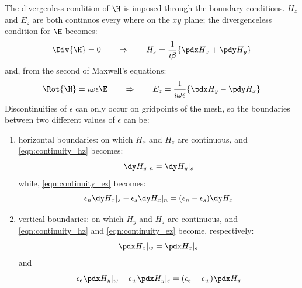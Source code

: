 The divergenless condition of $\H$ is imposed through the boundary
conditions. $H_z$ and $E_z$ are both continuos every where on the $xy$
plane; the divergenceless condition for $\H$ becomes:
\begin{equation} \label{eqn:continuity_hz}
\Div{\H} = 0 \qquad \Rightarrow \qquad H_z = \frac{1}{\imath
  \beta} \{ \pdx H_x + \pdy H_y \}
\end{equation}
and, from the second of Maxwell's equations:
\begin{equation} \label{eqn:continuity_ez}
  \Rot{\H} = \imath \omega \epsilon \E \qquad \Rightarrow \qquad E_z =
  \frac{1}{\imath \omega \epsilon} \{ \pdx H_y - \pdy H_x \}
\end{equation}
Discontinuities of $\epsilon$ can only occur on gridpoints of the
mesh, so the boundaries between two different values of $\epsilon$ can be:
\begin{enumerate}
\item
  horizontal boundaries: on which $H_x$ and $H_z$ are continuous, and
  \ref{eqn:continuity_hz} becomes:
  $$
  \dy H_y|_n = \dy H_y|_s
  $$
  while, \ref{eqn:continuity_ez} becomes:
  $$
  \epsilon_n \dy H_x|_s - \epsilon_s \dy H_x|_n = (\epsilon_n -
  \epsilon_s) \dy H_x
  $$
\item
  vertical boundaries: on which $H_y$ and $H_z$ are continuous, and
  \ref{eqn:continuity_hz} and \ref{eqn:continuity_ez} become,
  respectively:
  $$
  \pdx H_x|_w = \pdx H_x|_e
  $$
  and
  $$
  \epsilon_e \pdx H_y|_w - \epsilon_w \pdx H_y|_e = (\epsilon_e -
  \epsilon_w) \pdx H_y
  $$
\end{enumerate}

